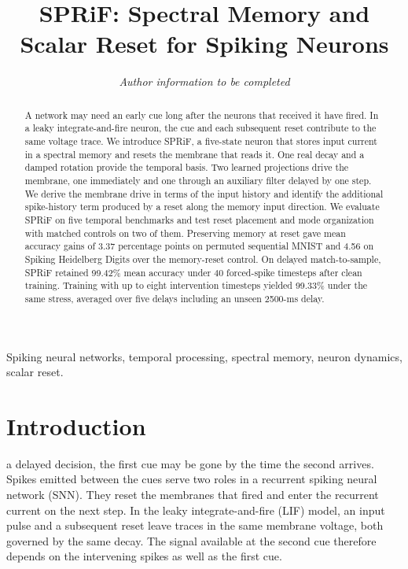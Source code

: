 \documentclass[letterpaper,journal]{IEEEtran}
\begin{document}
\title{SPRiF: Spectral Memory and Scalar Reset for Spiking Neurons}
\author{\textit{Author information to be completed}}
\maketitle

\begin{abstract}
A network may need an early cue long after the neurons that received it have fired. In a leaky integrate-and-fire neuron, the cue and each subsequent reset contribute to the same voltage trace. We introduce SPRiF, a five-state neuron that stores input current in a spectral memory and resets the membrane that reads it. One real decay and a damped rotation provide the temporal basis. Two learned projections drive the membrane, one immediately and one through an auxiliary filter delayed by one step. We derive the membrane drive in terms of the input history and identify the additional spike-history term produced by a reset along the memory input direction. We evaluate SPRiF on five temporal benchmarks and test reset placement and mode organization with matched controls on two of them. Preserving memory at reset gave mean accuracy gains of 3.37 percentage points on permuted sequential MNIST and 4.56 on Spiking Heidelberg Digits over the memory-reset control. On delayed match-to-sample, SPRiF retained 99.42\% mean accuracy under 40 forced-spike timesteps after clean training. Training with up to eight intervention timesteps yielded 99.33\% under the same stress, averaged over five delays including an unseen 2500-ms delay.
\end{abstract}

\begin{IEEEkeywords}
Spiking neural networks, temporal processing, spectral memory, neuron dynamics, scalar reset.
\end{IEEEkeywords}

\section{Introduction}
\label{sec:introduction}

 a delayed decision, the first cue may be gone by the time the second arrives. Spikes emitted between the cues serve two roles in a recurrent spiking neural network (SNN). They reset the membranes that fired and enter the recurrent current on the next step. In the leaky integrate-and-fire (LIF) model, an input pulse and a subsequent reset leave traces in the same membrane voltage, both governed by the same decay. The signal available at the second cue therefore depends on the intervening spikes as well as the first cue.
\end{document}
